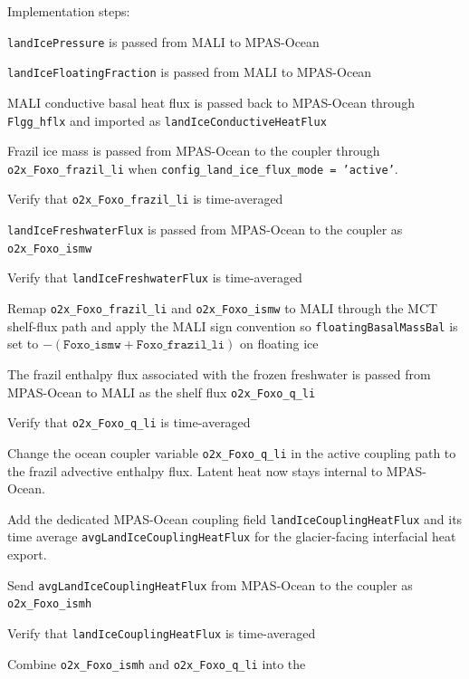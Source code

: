 \documentclass[11pt]{report}
\newcommand{\cmark}{\ding{51}}%
\newcommand{\done}{\rlap{$\square$}{\raisebox{2pt}{\large\hspace{1pt}\cmark}}%
\hspace{-2.5pt}}
\begin{document}
\newpage
Implementation steps:
\begin{todolist}
    \item[\done] \texttt{landIcePressure} is passed from MALI to MPAS-Ocean
    \item[\done] \texttt{landIceFloatingFraction} is passed from MALI to MPAS-Ocean
    \item[\done] MALI conductive basal heat flux is passed back to MPAS-Ocean through
    \texttt{Flgg\_hflx} and imported as \texttt{landIceConductiveHeatFlux}
    \item[\done] Frazil ice mass is passed from MPAS-Ocean to the coupler through
    \texttt{o2x\_Foxo\_frazil\_li} when \texttt{config\_land\_ice\_flux\_mode = 'active'}.
    \item[\done] Verify that \texttt{o2x\_Foxo\_frazil\_li} is time-averaged
    \item[\done] \texttt{landIceFreshwaterFlux} is passed from MPAS-Ocean to the coupler as \texttt{o2x\_Foxo\_ismw}
    \item[\done] Verify that \texttt{landIceFreshwaterFlux} is time-averaged
    \item[\done] Remap \texttt{o2x\_Foxo\_frazil\_li} and \texttt{o2x\_Foxo\_ismw} to MALI
    through the MCT shelf-flux path and apply the MALI sign convention so
    \texttt{floatingBasalMassBal} is set to
    $-(\texttt{Foxo\_ismw} + \texttt{Foxo\_frazil\_li})$ on floating ice
    \item[\done] The frazil enthalpy flux associated with the frozen freshwater
    is passed from MPAS-Ocean to MALI as the shelf flux \texttt{o2x\_Foxo\_q\_li}
    \item[\done] Verify that \texttt{o2x\_Foxo\_q\_li} is time-averaged
    \item[\done] Change the ocean coupler variable \texttt{o2x\_Foxo\_q\_li} in the active
    coupling path to the frazil advective enthalpy flux.  Latent heat now stays
    internal to MPAS-Ocean.
    \item[\done] Add the dedicated MPAS-Ocean coupling field
    \texttt{landIceCouplingHeatFlux} and its time average
    \texttt{avgLandIceCouplingHeatFlux} for the glacier-facing interfacial heat
    export.
    \item[\done] Send \texttt{avgLandIceCouplingHeatFlux} from MPAS-Ocean to the
    coupler as \texttt{o2x\_Foxo\_ismh}
    \item[\done] Verify that \texttt{landIceCouplingHeatFlux} is time-averaged
    \item[\done] Combine \texttt{o2x\_Foxo\_ismh} and \texttt{o2x\_Foxo\_q\_li} into the

\end{todolist}
\end{document}
